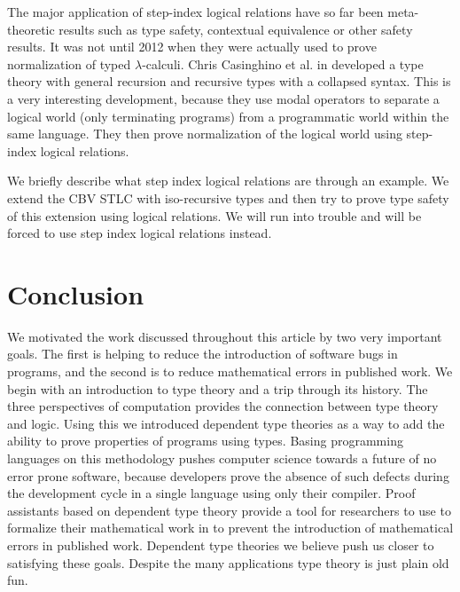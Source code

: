 \documentclass{article}
\begin{document}
The major application of step-index logical relations have so far been
meta-theoretic results such as type safety, contextual equivalence or
other safety results. It was not until 2012 when they were actually
used to prove normalization of typed $\lambda$-calculi.  Chris
Casinghino et al. in \cite{Casinghino:2012} developed a type theory
with general recursion and recursive types with a collapsed syntax.
This is a very interesting development, because they use modal
operators to separate a logical world (only terminating programs) from
a programmatic world within the same language.  They then prove
normalization of the logical world using step-index logical relations.

We briefly describe what step index logical relations are through an
example.  We extend the CBV STLC with iso-recursive types and then try
to prove type safety of this extension using logical relations.  We
will run into trouble and will be forced to use step index logical
relations instead.



\section{Conclusion}
\label{sec:conclusion}
We motivated the work discussed throughout this article by two very
important goals.  The first is helping to reduce the introduction of
software bugs in programs, and the second is to reduce mathematical
errors in published work.  We begin with an introduction to type
theory and a trip through its history.  The three perspectives of
computation provides the connection between type theory and logic.
Using this we introduced dependent type theories as a way to add the
ability to prove properties of programs using types.  Basing
programming languages on this methodology pushes computer science
towards a future of no error prone software, because developers prove
the absence of such defects during the development cycle in a single
language using only their compiler.  Proof assistants based on
dependent type theory provide a tool for researchers to use to
formalize their mathematical work in to prevent the introduction of
mathematical errors in published work.  Dependent type theories we
believe push us closer to satisfying these goals.  Despite the many
applications type theory is just plain old fun.
\end{document}
